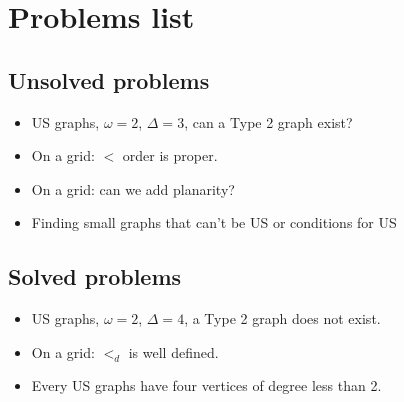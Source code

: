 \documentclass[12pt]{article}
\theoremstyle{definition}
\theoremstyle{remark}
\begin{document}
\section{Problems list}

\subsection{Unsolved problems}

\begin{itemize}
    \item US graphs, $\omega = 2$, $\Delta=3$, can a Type 2 graph exist?
    \item On a grid: $<$ order is proper.
    \item On a grid: can we add planarity?
    \item Finding small graphs that can't be US or conditions for US
\end{itemize}



\subsection{Solved problems}

\begin{itemize}
    \item US graphs, $\omega = 2$, $\Delta=4$, a Type 2 graph does not exist.
    \item On a grid: $<_d$ is well defined.
    \item Every US graphs have four vertices of degree less than 2. 
\end{itemize}
\end{document}
